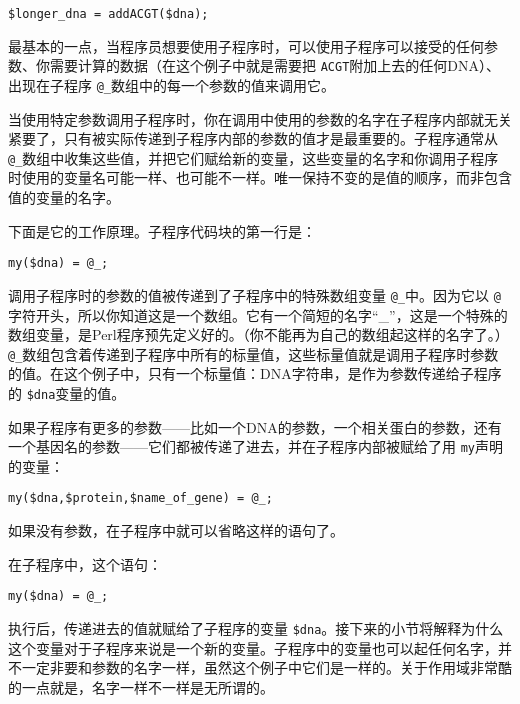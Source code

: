 \begin{lstlisting}
$longer_dna = addACGT($dna);
\end{lstlisting}

最基本的一点，当程序员想要使用子程序时，可以使用子程序可以接受的任何参数、你需要计算的数据（在这个例子中就是需要把 \verb|ACGT|附加上去的任何DNA）、出现在子程序 \verb|@_|数组中的每一个参数的值来调用它。

当使用特定参数调用子程序时，你在调用中使用的参数的名字在子程序内部就无关紧要了，只有被实际传递到子程序内部的参数的值才是最重要的。子程序通常从 \verb|@_|数组中收集这些值，并把它们赋给新的变量，这些变量的名字和你调用子程序时使用的变量名可能一样、也可能不一样。唯一保持不变的是值的顺序，而非包含值的变量的名字。

下面是它的工作原理。子程序代码块的第一行是：

\begin{lstlisting}
my($dna) = @_; 
\end{lstlisting}

调用子程序时的参数的值被传递到了子程序中的特殊数组变量 \verb|@_|中。因为它以 \verb|@|字符开头，所以你知道这是一个数组。它有一个简短的名字“\_”，这是一个特殊的数组变量，是Perl程序预先定义好的。（你不能再为自己的数组起这样的名字了。） \verb|@_|数组包含着传递到子程序中所有的标量值，这些标量值就是调用子程序时参数的值。在这个例子中，只有一个标量值：DNA字符串，是作为参数传递给子程序的 \verb|$dna|变量的值。

如果子程序有更多的参数——比如一个DNA的参数，一个相关蛋白的参数，还有一个基因名的参数——它们都被传递了进去，并在子程序内部被赋给了用 \verb|my|声明的变量：

\begin{lstlisting}
my($dna,$protein,$name_of_gene) = @_;
\end{lstlisting}

如果没有参数，在子程序中就可以省略这样的语句了。

在子程序中，这个语句：

\begin{lstlisting}
my($dna) = @_;
\end{lstlisting}

执行后，传递进去的值就赋给了子程序的变量 \verb|$dna|。接下来的小节将解释为什么这个变量对于子程序来说是一个新的变量。子程序中的变量也可以起任何名字，并不一定非要和参数的名字一样，虽然这个例子中它们是一样的。关于作用域非常酷的一点就是，名字一样不一样是无所谓的。



